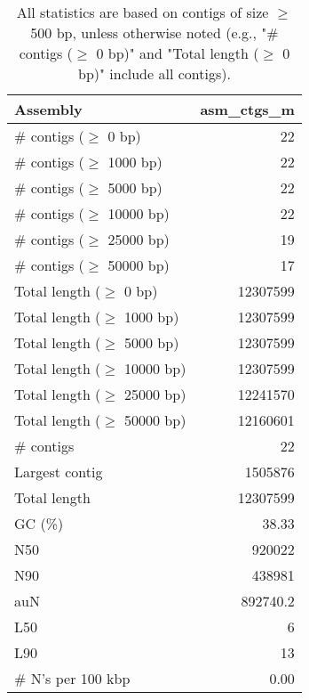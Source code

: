 \documentclass[12pt,a4paper]{article}
\begin{document}
\begin{table}[ht]
\begin{center}
\caption{All statistics are based on contigs of size $\geq$ 500 bp, unless otherwise noted (e.g., "\# contigs ($\geq$ 0 bp)" and "Total length ($\geq$ 0 bp)" include all contigs).}
\begin{tabular}{|l*{1}{|r}|}
\hline
Assembly & asm\_ctgs\_m \\ \hline
\# contigs ($\geq$ 0 bp) & 22 \\ \hline
\# contigs ($\geq$ 1000 bp) & 22 \\ \hline
\# contigs ($\geq$ 5000 bp) & 22 \\ \hline
\# contigs ($\geq$ 10000 bp) & 22 \\ \hline
\# contigs ($\geq$ 25000 bp) & 19 \\ \hline
\# contigs ($\geq$ 50000 bp) & 17 \\ \hline
Total length ($\geq$ 0 bp) & 12307599 \\ \hline
Total length ($\geq$ 1000 bp) & 12307599 \\ \hline
Total length ($\geq$ 5000 bp) & 12307599 \\ \hline
Total length ($\geq$ 10000 bp) & 12307599 \\ \hline
Total length ($\geq$ 25000 bp) & 12241570 \\ \hline
Total length ($\geq$ 50000 bp) & 12160601 \\ \hline
\# contigs & 22 \\ \hline
Largest contig & 1505876 \\ \hline
Total length & 12307599 \\ \hline
GC (\%) & 38.33 \\ \hline
N50 & 920022 \\ \hline
N90 & 438981 \\ \hline
auN & 892740.2 \\ \hline
L50 & 6 \\ \hline
L90 & 13 \\ \hline
\# N's per 100 kbp & 0.00 \\ \hline
\end{tabular}
\end{center}
\end{table}
\end{document}
